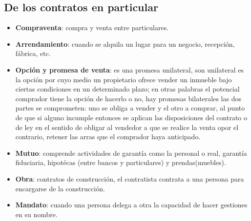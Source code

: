 \documentclass{article}
\begin{document}
\subsection{De los contratos en particular}
\begin{itemize}
    \item \textbf{Compraventa}: compra y venta entre particulares.
    \item \textbf{Arrendamiento}: cuando se alquila un lugar para un negocio, recepción, fábrica, etc.
    \item \textbf{Opción y promesa de venta}: es una promesa unilateral, son unilateral es la opción por cuyo medio un propietario ofrece vender un inmueble bajo ciertas condiciones en un determinado plazo; en otras palabras el potencial comprador tiene la opción de hacerlo o no, hay promesas bilaterales las dos partes se comprometen: uno se obliga a vender y el otro a comprar, al punto de que si alguno incumple entonces se aplican las disposiciones del contrato o de ley en el sentido de obligar al vendedor a que se realice la venta opor el contrario, retener las arras que el comprador haya anticipado.
    \item \textbf{Mutuo}: comprende actividades de garantía como la personal o real, garantía fiduciaria, hipotécas (entre bancos y particulares) y prendas(muebles).
    \item \textbf{Obra}: contratos de construcción, el contratista contrata a una persona para encargarse de la construcción.
    \item \textbf{Mandato}: cuando una persona delega a otra la capacidad de hacer gestiones en su nombre.
\end{itemize}
\end{document}

